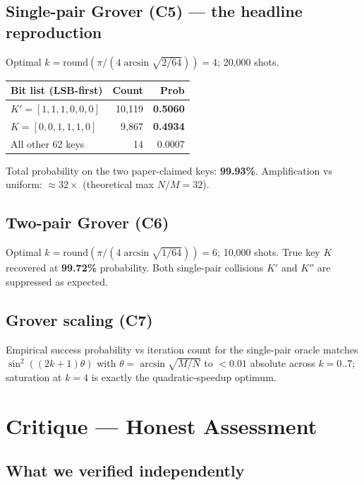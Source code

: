 \documentclass[11pt]{article}
\begin{document}
\subsection*{Single-pair Grover (C5) --- the headline reproduction}

Optimal $k = \mathrm{round}(\pi/(4\arcsin\sqrt{2/64})) = 4$; 20{,}000 shots.

\begin{tabular}{|l|r|r|}
\hline
Bit list (LSB-first) & Count & Prob \\ \hline
$K'=[1,1,1,0,0,0]$ & 10{,}119 & \textbf{0.5060} \\ \hline
$K=[0,0,1,1,1,0]$  &  9{,}867 & \textbf{0.4934} \\ \hline
All other 62 keys  &     14   & 0.0007 \\ \hline
\end{tabular}

Total probability on the two paper-claimed keys: \textbf{99.93\%}. Amplification vs
uniform: $\approx 32\times$ (theoretical max $N/M = 32$).

\subsection*{Two-pair Grover (C6)}

Optimal $k = \mathrm{round}(\pi/(4\arcsin\sqrt{1/64})) = 6$; 10{,}000 shots.
True key $K$ recovered at \textbf{99.72\%} probability. Both single-pair collisions
$K'$ and $K''$ are suppressed as expected.

\subsection*{Grover scaling (C7)}

Empirical success probability vs iteration count for the single-pair oracle
matches $\sin^2((2k+1)\theta)$ with $\theta = \arcsin\sqrt{M/N}$ to $<0.01$ absolute
across $k=0..7$; saturation at $k=4$ is exactly the quadratic-speedup optimum.

\section{Critique --- Honest Assessment}

\subsection*{What we verified independently}
\end{document}
